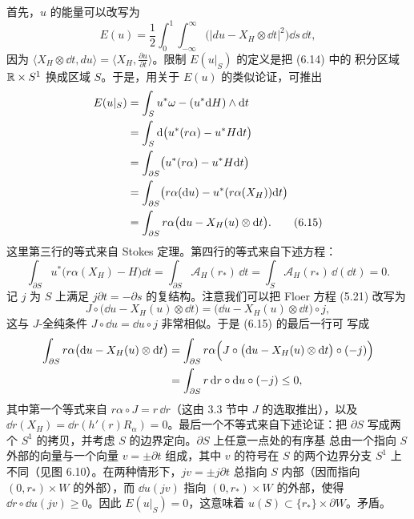 \begin{wproof}[断言 6.3.1 的证明]
首先，$u$ 的能量可以改写为
\begin{equation}\tag{6.14}
  E(u)=\frac{1}{2}\int_0^1\int_{-\infty}^{\infty}
  \bigl(|du-X_H\otimes\dd t|^2\bigr)\dd s\,\dd t,
\end{equation}
因为 $\langle X_H\otimes\dd t,du\rangle=\bigl\langle X_H,
\frac{\partial u}{\partial t}\bigr\rangle$。限制 $E(u|_S)$ 的定义是把 (6.14) 中的
积分区域 $\mathbb{R}\times S^1$ 换成区域 $S$。于是，用关于 $E(u)$ 的类似论证，可推出
\begin{align}
  E(u|_S)&=\int_S u^*\omega-(u^*\mathrm{d} H)\wedge\mathrm{d} t\notag\\
  &=\int_S\mathrm{d}\bigl(u^*(r\alpha)-u^*H\mathrm{d} t\bigr)\notag\\
  &=\int_{\partial S}\bigl(u^*(r\alpha)-u^*H\mathrm{d} t\bigr)\notag\\
  &=\int_{\partial S}\bigl(r\alpha(\mathrm{d} u)-u^*(r\alpha(X_H))\mathrm{d} t\bigr)\notag\\
  &=\int_{\partial S}r\alpha\bigl(\mathrm{d} u-X_H(u)\otimes\mathrm{d} t\bigr).
  \tag{6.15}
\end{align}
这里第三行的等式来自 Stokes 定理。第四行的等式来自下述方程：
\[
  \int_{\partial S}u^*\bigl(r\alpha(X_H)-H\bigr)\dd t
  =\int_{\partial S}\mathcal{A}_H(r_\ast)\,\dd t
  =\int_S\mathcal{A}_H(r_\ast)\,\dd(\dd t)=0.
\]
记 $j$ 为 $S$ 上满足 $j\partial t=-\partial s$ 的复结构。注意我们可以把 Floer 方程
(5.21) 改写为
\[
  J\circ\bigl(\dd u-X_H(u)\otimes\dd t\bigr)
  =\bigl(\dd u-X_H(u)\otimes\dd t\bigr)\circ j,
\]
这与 $J$-全纯条件 $J\circ\dd u=\dd u\circ j$ 非常相似。于是 (6.15) 的最后一行可
写成
\begin{align*}
  \int_{\partial S}r\alpha\bigl(\mathrm{d} u-X_H(u)\otimes\mathrm{d} t\bigr)
  &=\int_{\partial S}r\alpha\Bigl(J\circ\bigl(\mathrm{d} u-X_H(u)\otimes\mathrm{d} t\bigr)\circ(-j)\Bigr)\\
  &=\int_{\partial S}r\,\mathrm{d} r\circ\mathrm{d} u\circ(-j)\le0,
\end{align*}
其中第一个等式来自 $r\alpha\circ J=r\,\dd r$（这由 3.3 节中 $J$ 的选取推出），以及
$\dd r(X_H)=\dd r(h'(r)R_\alpha)=0$。最后一个不等式来自下述论证：把 $\partial S$
写成两个 $S^1$ 的拷贝，并考虑 $S$ 的边界定向。$\partial S$ 上任意一点处的有序基
总由一个指向 $S$ 外部的向量与一个向量 $v=\pm\partial t$ 组成，其中 $v$ 的符号在 $S$
的两个边界分支 $S^1$ 上不同（见图 6.10）。在两种情形下，$jv=\pm j\partial t$ 总指向
$S$ 内部（因而指向 $(0,r_\ast)\times W$ 的外部），而 $\dd u(jv)$ 指向
$(0,r_\ast)\times W$ 的外部，使得 $\dd r\circ\dd u(jv)\ge0$。因此
$E(u|_S)=0$，这意味着 $u(S)\subset\{r_\ast\}\times\partial W$。矛盾。
\end{wproof}

